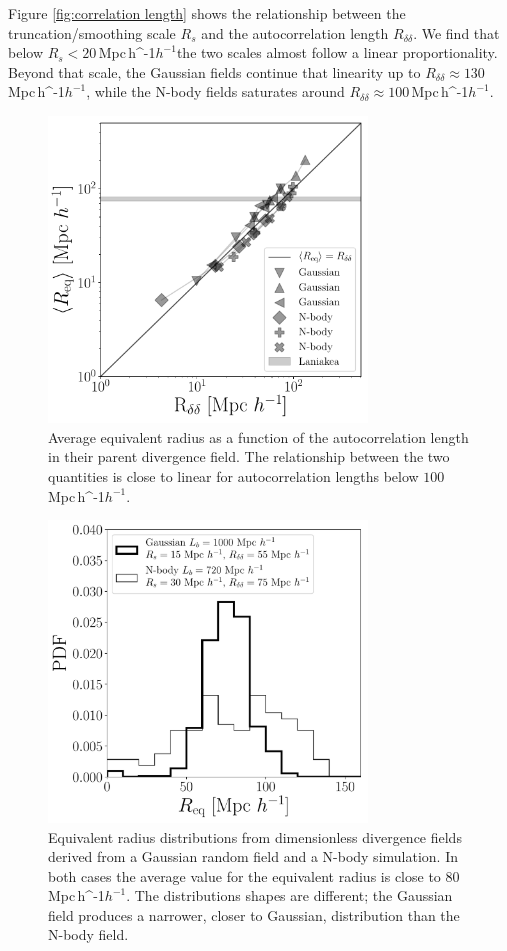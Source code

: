 \documentclass[usenatbib]{mnras}
\newcommand{\Mpch}{\,{\rm Mpc}\,\ifmmode h^{-1}\else $h^{-1}$\fi}
\begin{document}
Figure \ref{fig:correlation length} shows the relationship between the truncation/smoothing scale $R_s$ and the autocorrelation length $R_{\delta\delta}$.
We find that below $R_{s} < 20$\Mpch the two scales almost follow a linear proportionality.
Beyond that scale, the Gaussian fields continue that linearity up to $R_{\delta\delta}\approx 130$\Mpch, while the N-body fields saturates around $R_{\delta\delta}\approx 100$\Mpch.


\begin{figure}
    \centering
    \includegraphics[width=240pt]{summary_watershed.pdf}
    \caption{Average equivalent radius as a function of the autocorrelation length in their parent divergence field.
    The relationship between the two quantities is close to linear for autocorrelation lengths below $100$ \Mpch. \label{fig:money_plot}}
\end{figure}


 
\begin{figure}
    \centering
    \includegraphics[width=240pt]{sizes_histogram.pdf}
    \caption{Equivalent radius distributions from dimensionless divergence fields derived from a Gaussian random field and a N-body simulation.
    In both cases the average value for the equivalent radius is close to $80$\Mpch. 
    The distributions shapes are different; the Gaussian field produces a narrower, closer to Gaussian, distribution than the N-body field. }  
    \label{fig:Nclusters}
\end{figure}
\end{document}
